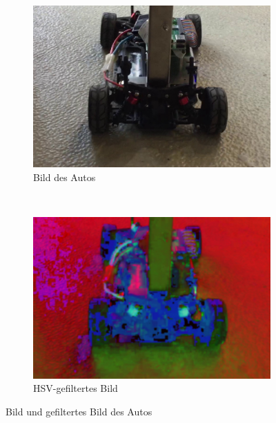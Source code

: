 \documentclass[10pt]{article}
\begin{document}
    \begin{figure}[htbp]
        \centering
        \begin{subfigure}[b]{0.4\textwidth}
            \includegraphics[width=\textwidth]{car}
            \caption{Bild des Autos}\label{fig:car}
        \end{subfigure}~\begin{subfigure}[b]{0.4\textwidth}
            \includegraphics[width=\textwidth]{car_hsv}
            \caption{HSV-gefiltertes Bild}\label{fig:car_hcsv}
        \end{subfigure}
        \caption{Bild und gefiltertes Bild des Autos}\label{fig:cars}
    \end{figure}
\end{document}
